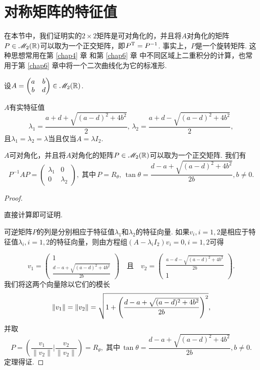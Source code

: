 \section{对称矩阵的特征值}

在本节中，我们证明实的$2\times2$矩阵是可对角化的，并且将$A$对角化的矩阵$P\in\mathscr M_2(\mathbb R)$可以取为一个正交矩阵，即$P^{\mathrm T}=P^{-1}$. 事实上，$P$是一个旋转矩阵. 这种思想常用在第 \ref{chap4} 章 和第 \ref{chap6} 章 中不同区域上二重积分的计算，也常用于第 \ref{chap6} 章中将一个二次曲线化为它的标准形.

\begin{mybox}
  \begin{theorem}[对称矩阵及其特征值.]

  设$A=\begin{pmatrix}
    a & b \\
    b & d
  \end{pmatrix}\in\mathscr M_2(\mathbb R)$.
  \begin{enum}
    \item $A$有实特征值
      \[
        \lambda_1 = \frac{a + d + \sqrt{(a - d)^2 + 4b^2} }2 ,\,\lambda_2 = \frac{a + d - \sqrt{(a - d)^2 + 4b^2 } }2,
      \]
      且$\lambda_1=\lambda_2=\lambda$当且仅当$A=\lambda I_2$.
    \item $A$可对角化，并且将$A$对角化的矩阵$P\in\mathscr M_2(\mathbb R)$可以取为一个正交矩阵. 我们有
        \[
          P^{-1}AP = \begin{pmatrix}
            \lambda_1 & 0 \\
            0 & \lambda_2
          \end{pmatrix},\;\text{其中}\, P=R_\theta,\,\tan\theta =
          \frac{d - a + \sqrt{(a-d)^2+4b^2}}{2b},b\ne0.
        \]
  \end{enum}
  \end{theorem}
\end{mybox}

\begin{proof}
  \begin{enuma}
    \item 直接计算即可证明.
    \item 可逆矩阵$P$的列是分别相应于特征值$\lambda_1$和$\lambda_2$的特征向量. 如果$v_i,i=1,2$是相应于特征值$\lambda_i,i=1,2$的特征向量，则由方程组$(A-\lambda_iI_2)v_i=0,i=1,2$可得
  \end{enuma}
    \[
      v_1 = \begin{pmatrix}
        1 \\
        \frac{d - a + \sqrt{(a - d)^2 + 4b^2} }{2b}
      \end{pmatrix}\quad \text{且}\quad
      v_2 = \begin{pmatrix}
        \frac{a - d - \sqrt{(a - d)^2 + 4b^2} }{2b} \\ 1
      \end{pmatrix}.
    \]
    我们将这两个向量除以它们的模长
    \[
      \| v_1 \| = \| v_2 \| = \SQRT{
        1 + \left( \frac{d - a + \sqrt{(a - d)^2 + 4b^2} }{2b} \right)^2
      },
    \]
    并取
    \[
      P = \left( \frac{v_1}{\|v_2\|}\bigg|
      \frac{v_2}{\|v_2\|} \right) = R_\theta,\;\text{其中}
      \,\tan\theta =
          \frac{d - a + \sqrt{(a-d)^2+4b^2}}{2b},b\ne0.
    \]
    定理得证.
\end{proof}


